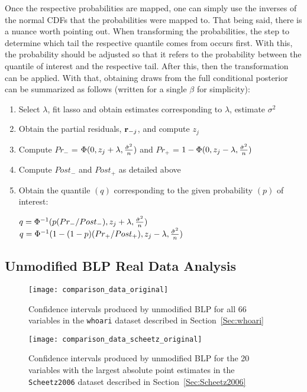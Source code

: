 

Once the respective probabilities are mapped, one can simply use the inverses of the normal CDFs that the probabilities were mapped to. That being said, there is a nuance worth pointing out. When transforming the probabilities, the step to determine which tail the respective quantile comes from occurs first. With this, the probability should be adjusted so that it refers to the probability between the quantile of interest and the respective tail. After this, then the transformation can be applied. With that, obtaining draws from the full conditional posterior can be summarized as follows (written for a single $\beta$ for simplicity):

\begin{enumerate}
  \item Select $\lambda$, fit lasso and obtain estimates corresponding to $\lambda$, estimate $\sigma^2$
	\item Obtain the partial residuals, $\mathbf{r}_{-j}$, and compute $z_j$
	\item Compute $Pr_{-}$ = $\Phi(0, z_j + \lambda, \frac{\hat{\sigma}^2}{n})$ and $Pr_{+}$ = $1 - \Phi(0, z_j - \lambda, \frac{\hat{\sigma}^2}{n})$
	\item Compute $Post_-$ and $Post_+$ as detailed above
	\item Obtain the quantile $(q)$ corresponding to the given probability $(p)$ of interest:
  \begin{algorithmic}
      \State $q = \Phi^{-1}(p(Pr_{-} / Post_{-}), z_j + \lambda, \frac{\hat{\sigma}^2}{n})$
    \Else
        \State $q = \Phi^{-1}(1 - (1 - p)(Pr_{+} / Post_{+}), z_j - \lambda, \frac{\hat{\sigma}^2}{n})$
    \EndIf
  \end{algorithmic}
\end{enumerate}
  
\subsection{Unmodified BLP Real Data Analysis}\label{Sec:Unmodified}

\begin{figure}[hbtp]
  \begin{center}
  \texttt{[image: comparison\_data\_original]}
  \caption{\label{Fig:comparison_data_whoari_original} Confidence intervals produced by unmodified BLP for all 66 variables in the \texttt{whoari} dataset described in Section~\ref{Sec:whoari}}
  \end{center}
\end{figure}

\begin{figure}[hbtp]
  \begin{center}
  \texttt{[image: comparison\_data\_scheetz\_original]}
  \caption{\label{Fig:comparison_data_scheetz_original} Confidence intervals produced by unmodified BLP for the 20 variables with the largest absolute point estimates in the \texttt{Scheetz2006} dataset described in Section~\ref{Sec:Scheetz2006}}
  \end{center}
\end{figure}

\newpage
